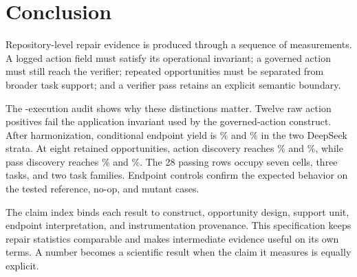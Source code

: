 \section{Conclusion}
\label{sec:conclusion}

Repository-level repair evidence is produced through a sequence of measurements. A logged action field must satisfy its operational invariant; a governed action must still reach the verifier; repeated opportunities must be separated from broader task support; and a verifier pass retains an explicit semantic boundary.

The \TotalRows-execution audit shows why these distinctions matter. Twelve raw action positives fail the application invariant used by the governed-action construct. After harmonization, conditional endpoint yield is \CleanYield\% and \ExtensionYield\% in the two DeepSeek strata. At eight retained opportunities, action discovery reaches \CleanActionDiscoveryKEight\% and \ExtensionActionDiscoveryKEight\%, while pass discovery reaches \CleanPassDiscoveryKEight\% and \ExtensionPassDiscoveryKEight\%. The 28 passing rows occupy seven cells, three tasks, and two task families. Endpoint controls confirm the expected behavior on the tested reference, no-op, and mutant cases.

The claim index binds each result to construct, opportunity design, support unit, endpoint interpretation, and instrumentation provenance. This specification keeps repair statistics comparable and makes intermediate evidence useful on its own terms. A number becomes a scientific result when the claim it measures is equally explicit.
